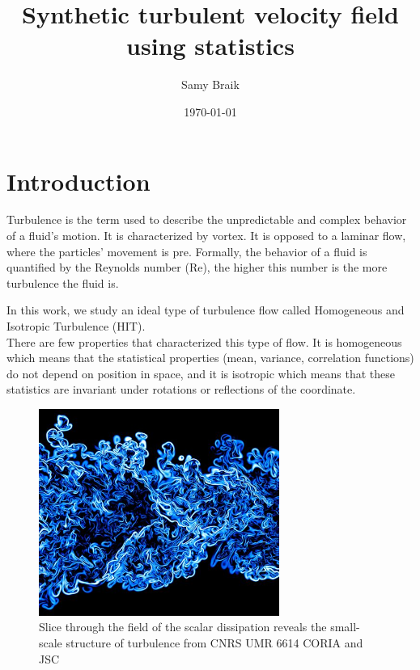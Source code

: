 \documentclass[a4paper,12pt]{article}
\title{Synthetic turbulent velocity field using statistics}
\author{Samy Braik}
\date{\today}
\theoremstyle{definition}
\begin{document}
\maketitle


\newpage
\tableofcontents
\newpage

\section{Introduction}
Turbulence is the term used to describe the unpredictable and complex behavior of a fluid's motion. It is characterized by vortex. It is opposed to a laminar flow, where the particles' movement is pre. Formally, the behavior of a fluid is quantified by the Reynolds number (Re), the higher this number is the more turbulence the fluid is. 

\bigskip

In this work, we study an ideal type of turbulence flow called Homogeneous and Isotropic Turbulence (HIT). \\
There are few properties that characterized this type of flow. It is homogeneous which means that the statistical properties (mean, variance, correlation functions) do not depend on position in space, and it is isotropic which means that these statistics are invariant under rotations or reflections of the coordinate.\\

\begin{figure}[H]
    \centering
    \includegraphics[width=0.7\textwidth]{illustrations/TurbulenceExample.jpg}
    \caption{Slice through the field of the scalar dissipation reveals the small-scale structure of turbulence from CNRS UMR 6614 CORIA and JSC}
\end{figure}
\end{document}

